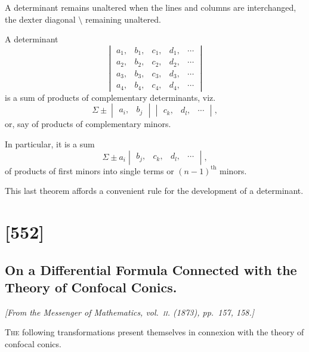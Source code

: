 \documentclass[11pt,a4paper]{article}
\theoremstyle{plain}
\theoremstyle{definition}
\begin{document}
A determinant remains unaltered when the lines and columns are interchanged, the
dexter diagonal $\setminus$ remaining unaltered.

\clearpage

A determinant
\[
\begin{vmatrix} a_1, & b_1, & c_1, & d_1, & \cdots \\ a_2, & b_2, & c_2, & d_2, & \cdots \\ a_3, & b_3, & c_3, & d_3, & \cdots \\ a_4, & b_4, & c_4, & d_4, & \cdots \end{vmatrix}
\]
is a sum of products of complementary determinants, viz.\
\[
\Sigma \pm \begin{vmatrix} a_i, & b_j \end{vmatrix}\begin{vmatrix} c_k, & d_l, & \cdots \end{vmatrix},
\]
or, say of products of complementary minors.

In particular, it is a sum
\[
\Sigma \pm a_i \begin{vmatrix} b_j, & c_k, & d_l, & \cdots \end{vmatrix},
\]
of products of first minors into single terms or $(n-1)^{\text{th}}$ minors.

This last theorem affords a convenient rule for the development of a determinant.

\clearpage

\section{[552]}
\subsection{On a Differential Formula Connected with the Theory of Confocal Conics.}

\begin{center}
\textit{[From the Messenger of Mathematics, vol.~\textsc{ii}. (1873), pp.~157, 158.]}
\end{center}

\textsc{The} following transformations present themselves in connexion with the theory of
confocal conics.
\end{document}
